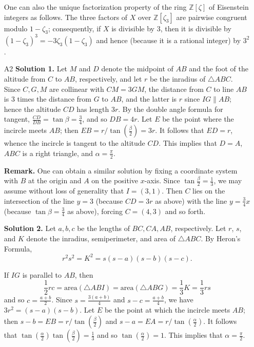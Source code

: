 \documentclass[amssymb,twocolumn,pra,10pt,aps]{revtex4-1}
\newcommand{\ZZ}{\mathbb{Z}}
\begin{document}
\begin{itemize}
One can also the unique factorization property of the ring $\ZZ[\zeta]$ of Eisenstein integers as follows.
The three factors of $X$ over $\ZZ[\zeta_3]$ are pairwise congruent modulo $1-\zeta_3$; consequently,
if $X$ is divisible by 3, then it is divisible by $(1-\zeta_3)^3 = -3\zeta_3(1-\zeta_3)$ and hence 
(because it is a rational integer) by $3^2$.

\item[A2]
\noindent \textbf{Solution 1.}
Let $M$ and $D$ denote the midpoint of $AB$ and the foot of the altitude from $C$ to $AB$, respectively, and let $r$ be the inradius of $\bigtriangleup ABC$. Since $C,G,M$ are collinear with $CM = 3GM$, the distance from $C$ to line $AB$ is $3$ times the distance from $G$ to $AB$, and the latter is $r$ since $IG \parallel AB$; hence the altitude $CD$ has length $3r$. By the double angle formula for tangent, $\frac{CD}{DB} = \tan\beta = \frac{3}{4}$, and so $DB = 4r$. Let $E$ be the point where the incircle meets $AB$; then $EB = r/\tan(\frac{\beta}{2}) = 3r$. It follows that $ED = r$, whence the incircle is tangent to the altitude $CD$. This implies that $D=A$, $ABC$ is a right triangle, and $\alpha = \frac{\pi}{2}$.

\noindent
\textbf{Remark.}
One can obtain a similar solution by fixing a coordinate system with $B$ at the origin and $A$ on the positive 
$x$-axis. Since $\tan \frac{\beta}{2} = \frac{1}{3}$, we may assume without loss of generality that
$I = (3,1)$. Then $C$ lies on the intersection of the line $y=3$ (because $CD = 3r$ as above) 
with the line $y = \frac{3}{4} x$ (because $\tan \beta = \frac{3}{4}$ as above), forcing $C = (4,3)$ and so forth.

\noindent \textbf{Solution 2.}
Let $a,b,c$ be the lengths of $BC,CA,AB$, respectively.
Let $r$, $s$, and $K$ denote the inradius, semiperimeter, and area of $\triangle ABC$. 
By Heron's Formula,
\[
r^2s^2 = K^2 = s(s-a)(s-b)(s-c).
\]

If $IG$ is parallel to $AB$, then 
\[
\frac{1}{2} rc = 
\mathrm{area}(\triangle ABI) = \mathrm{area}(\triangle ABG) = \frac{1}{3} K = \frac{1}{3} rs
\]
and so $c = \frac{a+b}{2}$. Since $s = \frac{3(a+b)}{4}$ and $s-c = \frac{a+b}{4}$, we have 
$3r^2 = (s-a)(s-b)$. Let $E$ be the point at which the incircle meets $AB$; then $s-b = EB = r/\tan(\frac{\beta}{2})$ and $s-a = EA = r/\tan(\frac{\alpha}{2})$. It follows that $\tan(\frac{\alpha}{2})\tan(\frac{\beta}{2}) = \frac{1}{3}$ and so $\tan(\frac{\alpha}{2}) = 1$. This implies that $\alpha = \frac{\pi}{2}$.


\end{itemize}
\end{document}
